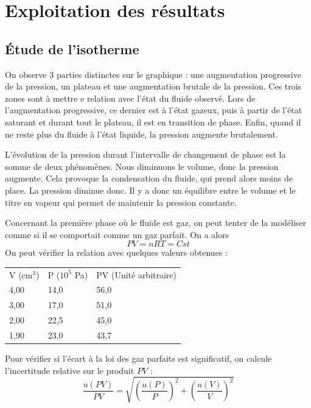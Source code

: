 \documentclass[a4paper,9pt,french]{scrartcl}
\begin{document}
\section{Exploitation des résultats}
\subsection{Étude de l'isotherme}
On observe 3 parties distinctes sur le graphique : une augmentation progressive 
de la pression, un plateau et une augmentation brutale de la pression. Ces trois zones sont 
à mettre e relation avec l'état du fluide observé. Lors de l'augmentation progressive,
ce dernier est à l'état gazeux, puis à partir de l'état saturant et durant tout le plateau, il est
en transition de phase. Enfin, quand il ne reste plus du fluide à l'état liquide, la pression augmente brutalement.

L'évolution de la pression durant l'intervalle de changement de phase est la somme de deux phénomènes. Nous diminuons le volume, donc la pression augmente. Cela provoque la condensation du fluide, qui prend alors moins de place.
La pression diminue donc. Il y a donc un équilibre entre le volume et le titre en vapeur qui permet de maintenir la 
pression constante.

Concernant la première phase où le fluide est gaz, on peut tenter de la modéliser comme si il se comportait comme un gaz parfait.
On a alors
\begin{equation}
    PV = nRT = Cst
\end{equation}
On peut vérifier la relation avec quelques valeurs obtenues :

\begin{table}[]
    \begin{center}
\begin{tabular}{lll}
V (cm$^3$) & P ($10^5$ Pa) & PV (Unité arbitraire) \\
4,00       & 14,0       & 56,0                   \\
3,00       & 17,0       & 51,0                   \\
2,00       & 22,5       & 45,0                   \\
1,90       & 23,0       & 43,7                                     
\end{tabular}
\end{center}
\end{table}

Pour vérifier si l'écart à la loi des gaz parfaits est significatif, on calcule l'incertitude relative sur le produit $PV$ :
\begin{equation}
    \frac{u(PV)}{PV} = \sqrt{\left(\frac{u(P)}{P}\right)^2 + \left(\frac{u(V)}{V}\right)^2}
\end{equation}
\end{document}
